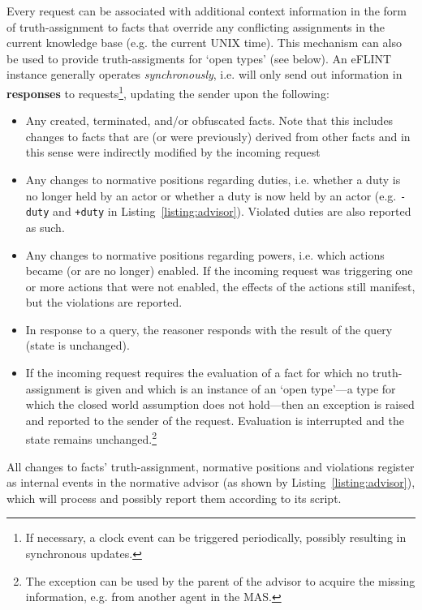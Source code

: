 Every request can be associated with additional context information in the form of truth-assignment to facts that override any conflicting assignments in the current knowledge base (e.g. the current UNIX time). This mechanism can also be used to provide truth-assigments for `open types' (see below). An eFLINT instance generally operates \textit{synchronously}, i.e. will only send out information in \textbf{responses} to requests\footnote{If necessary, a clock event can be triggered periodically, possibly resulting in synchronous updates.}, updating the sender upon the following:
%
\begin{itemize}
\item Any created, terminated, and/or obfuscated facts. %
Note that this includes changes to facts that are (or were previously) derived from other facts and in this sense were indirectly modified by the incoming request
\item Any changes to normative positions regarding duties, i.e. whether a duty is no longer held by an actor or whether a duty is now held by an actor (e.g. \texttt{-duty} and \texttt{+duty} in Listing~\ref{listing:advisor}). Violated duties are also reported as such.
\item Any changes to normative positions regarding powers, %
i.e. which actions became (or are no longer) enabled. If the incoming request was triggering one or more actions that were not enabled, the effects of the actions still manifest, but the violations are reported. 
\item In response to a query, the reasoner responds with the result of the query (state is unchanged).
\item If the incoming request requires the evaluation of a fact for which no truth-assignment is given and which is an instance of an `open type'---a type for which the closed world assumption does not hold---then an exception is raised and reported to the sender of the request. Evaluation is interrupted and the state remains unchanged.\footnote{The exception can be used by the parent of the advisor to acquire the missing information, e.g. from another agent in the MAS.}
\end{itemize}
%
All changes to facts' truth-assignment, normative positions and violations register as internal events in the normative advisor (as shown by Listing~\ref{listing:advisor}), which will process and possibly report them according to its script.
%
%

